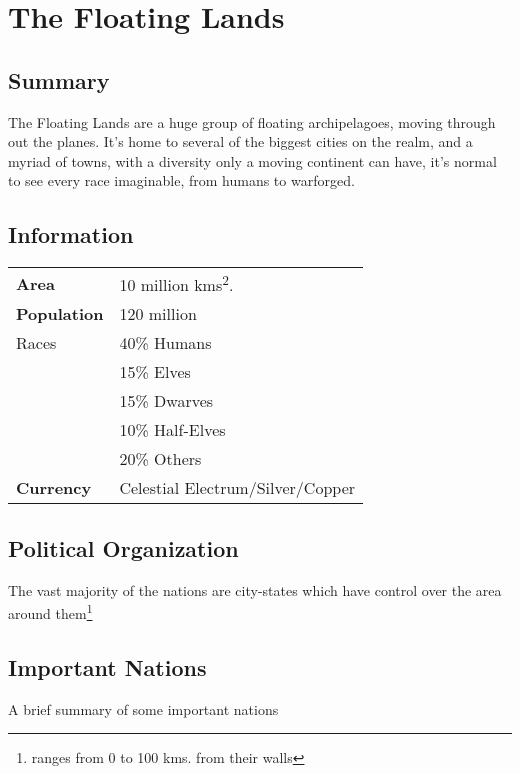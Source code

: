


\chapter{The Floating Lands}
\section{Summary}
The Floating Lands are a huge group of floating archipelagoes, moving through out the planes. It's home to several of the biggest cities on the realm, and a myriad of towns, with a diversity only a moving continent can have, it's normal to see every race imaginable, from humans to warforged.

\section{Information}
\begin{tabular}{| l | p{5cm} |}
    \cline{1-2}
    \textbf{Area}       & 10 million kms\textsuperscript{2}. \\
    \cline{1-2}
    \textbf{Population} & 120 million                        \\
    \cline{1-2}
    Races               & 40\% Humans                        \\
                        & 15\% Elves                         \\
                        & 15\% Dwarves                       \\
                        & 10\% Half-Elves                    \\
                        & 20\% Others                        \\
    \cline{1-2}
    \textbf{Currency}   & Celestial Electrum/Silver/Copper   \\
    \cline{1-2}
\end{tabular}

\section{Political Organization}
The vast majority of the nations are city-states which have control over the area around them\footnote{ranges from 0 to 100 kms. from their walls}

\section{Important Nations}
A brief summary of some important nations


